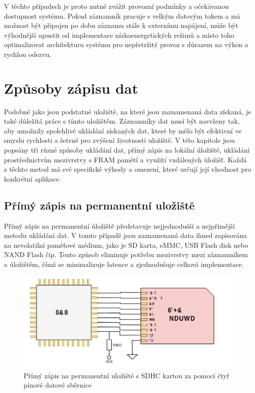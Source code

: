 V těchto případech je proto nutné zvážit provozní podmínky a očekávanou dostupnost systému. Pokud záznamník pracuje s velkým datovým tokem a má možnost být připojen po dobu záznamu stále k externímu napájení, může být výhodnější upustit od implementace nízkoenergetických režimů a místo toho optimalizovat architekturu systému pro nepřetržitý provoz s důrazem na výkon a rychlou odezvu. \cite{analog_devices_low_power_modes}


\section{Způsoby zápisu dat}
Podobně jako jsou podstatné uložiště, na které jsou zaznamenaná data získaná, je také důležitá práce s tímto uložištěm. Záznamníky dat musí být navrženy tak, aby umožnily spolehlivé ukládání získaných dat, které by mělo být efektivní ve smyslu rychlosti a šetrné pro zvýšení životnosti uložiště. V této kapitole jsou popsány tři různé způsoby ukládání dat, přímý zápis na lokální úložiště, ukládání prostřednictvím mezivrstvy s FRAM pamětí a využití vzdálených úložišť. Každá z těchto metod má své specifické výhody a omezení, které určují její vhodnost pro konkrétní aplikace.

\subsection{Přímý zápis na permanentní uložiště}
Přímý zápis na permanentní úložiště představuje nejjednodušší a nejpřímější metodu ukládání dat. V tomto případě jsou zaznamenaná data ihned zapisována na nevolatilní paměťové médium, jako je SD karta, eMMC, USB Flash disk nebo NAND Flash čip. Tento způsob eliminuje potřebu mezivrstvy mezi záznamníkem a úložištěm, čímž se minimalizuje latence a zjednodušuje celková implementace.

\begin{figure}[h]
    \centering
    \includegraphics[width=1.00\textwidth]{obrazky-figures/forward_write.pdf}
    
    \caption{Přímý zápis na permanentní uložiště s SDHC kartou za pomocí čtyř pinové datové sběrnice}
    \label{fig:forward-write}
\end{figure}

